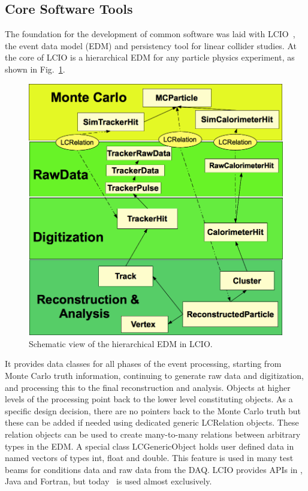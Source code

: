 \subsection{\label{sub:sw-core-tools}Core Software Tools}

The foundation for the development of common software was laid with LCIO~\cite{Gaede:2003ip}, the
event data model (EDM) and persistency tool for linear collider studies. At the core of LCIO is a hierarchical
EDM for any particle physics experiment, as shown in Fig.~\ref{fig:lcio_edm}.
\begin{figure}
\begin{center}
\includegraphics[width=0.60\hsize]{chapters/figures/lcio_edm_schema.png}
\end{center}
\caption{Schematic view of the hierarchical EDM in LCIO.}
\label{fig:lcio_edm}
\end{figure}
It provides data classes for all phases of the event processing,
starting from Monte Carlo truth information, continuing to generate
raw data and digitization, and processing this  to the final reconstruction and analysis. Objects at higher levels of the processing
point back to the lower level constituting objects. As a specific design decision, there are no pointers back to the
Monte Carlo truth but these can be added if needed using dedicated generic LCRelation objects.
These relation objects can be used to create many-to-many relations between arbitrary types in the EDM.
A special class LCGenericObject holds user defined data in named vectors of types int, float and double.
This feature is used in many test beams for conditions data and raw data from the DAQ.
LCIO provides APIs in \CPP, Java and Fortran, but today \CPP\ is used almost exclusively.


